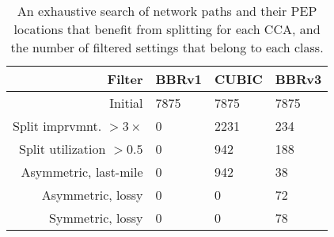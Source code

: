 \begin{table}[t!]
  \centering
\begin{tabular}{ r l l l }
  \toprule
    \textbf{Filter} & \textbf{BBRv1} & \textbf{CUBIC} & \textbf{BBRv3} \\
    \midrule
    Initial & 7875 & 7875 & 7875 \\
    Split imprvmnt. $>3\times$ & 0 & 2231 & 234 \\
    Split utilization $>0.5$ & 0 & 942 & 188 \\
    \midrule
    Asymmetric, last-mile & 0 & 942 & 38 \\
    Asymmetric, lossy & 0 & 0 & 72 \\
    Symmetric, lossy & 0 & 0 & 78 \\
    \bottomrule
\end{tabular}
  \caption{\label{tab:network-path-analysis} An exhaustive search of network
   paths and their PEP locations that benefit from splitting for each CCA, and
   the number of filtered settings that belong to each class.}
\end{table}

